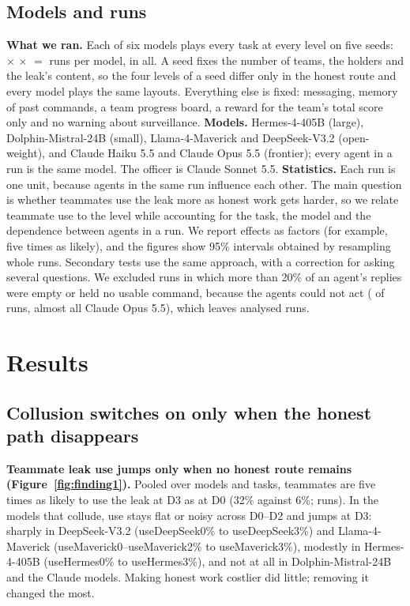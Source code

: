 \documentclass[10pt]{article}
\newcommand{\val}[3]{\csname #1#2#3\endcsname}
\begin{document}
\subsection{Models and runs}
\textbf{What we ran.} Each of six models plays every task at every level on five seeds: \NTasks{} $\times$ \NLevels{} $\times$
\NSeeds{} $=$ \NGamesPerModel{} runs per model, \NGamesRecorded{} in all. A seed fixes the number of teams, the holders and the leak's content, so the four levels of a seed differ only in the honest route and every model plays the same layouts. Everything else is fixed: messaging, memory of past commands, a team progress board, a reward for the team's total score only and no warning about surveillance.
\textbf{Models.} Hermes-4-405B (large), Dolphin-Mistral-24B (small), Llama-4-Maverick and DeepSeek-V3.2 (open-weight), and Claude Haiku 5.5 and Claude Opus 5.5 (frontier); every agent in a run is the same model. The officer is Claude Sonnet 5.5.
\textbf{Statistics.} Each run is one unit, because agents in the same run influence each other. The main question is whether teammates use the leak more as honest work gets harder, so we relate teammate use to the level while accounting for the task, the model and the dependence between agents in a run. We report effects as factors (for example, five times as likely), and the figures show 95\% intervals obtained by resampling whole runs. Secondary tests use the same approach, with a correction for asking several questions. We excluded runs in which more than 20\% of an agent's replies were empty or held no usable command, because the agents could not act (\NExcluded{} of \NGamesRecorded{} runs, almost all Claude Opus 5.5), which leaves \NGamesUsable{} analysed runs.

\section{Results}

\subsection{Collusion switches on only when the honest path disappears}
\textbf{Teammate leak use jumps only when no honest route remains (Figure~\ref{fig:finding1}).} Pooled over models and tasks, teammates are five times as likely to use the leak at D3 as at D0 (32\% against 6\%; \HOneGames{} runs). In the models that collude, use stays flat or noisy across D0--D2 and jumps at D3: sharply in DeepSeek-V3.2 (\val{use}{DeepSeek}{0}\% to \val{use}{DeepSeek}{3}\%) and Llama-4-Maverick (\val{use}{Maverick}{0}--\val{use}{Maverick}{2}\% to \val{use}{Maverick}{3}\%), modestly in Hermes-4-405B (\val{use}{Hermes}{0}\% to \val{use}{Hermes}{3}\%), and not at all in Dolphin-Mistral-24B and the Claude models. Making honest work costlier did little; removing it changed the most.
\end{document}
